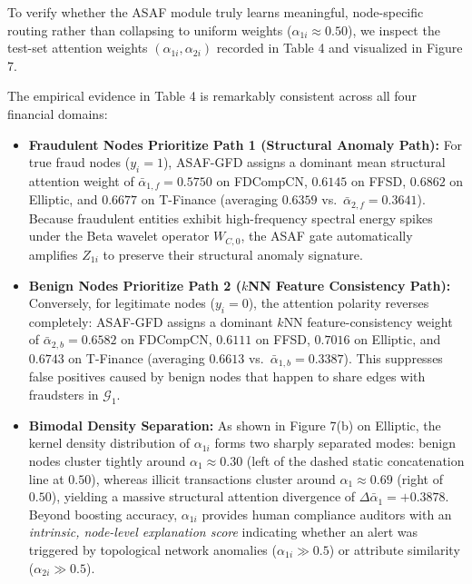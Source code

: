 \documentclass[10pt,a4paper,twocolumn]{article}
\begin{document}
To verify whether the ASAF module truly learns meaningful, node-specific routing rather than collapsing to uniform weights ($\alpha_{1i} \approx 0.50$), we inspect the test-set attention weights $(\alpha_{1i}, \alpha_{2i})$ recorded in Table 4 and visualized in Figure 7.

The empirical evidence in Table 4 is remarkably consistent across all four financial domains:

\begin{itemize}
  \item \textbf{Fraudulent Nodes Prioritize Path 1 (Structural Anomaly Path):} For true fraud nodes ($y_i = 1$), ASAF-GFD assigns a dominant mean structural attention weight of $\bar{\alpha}_{1,f} = \mathbf{0.5750}$ on FDCompCN, $\mathbf{0.6145}$ on FFSD, $\mathbf{0.6862}$ on Elliptic, and $\mathbf{0.6677}$ on T-Finance (averaging $0.6359$ vs.\ $\bar{\alpha}_{2,f} = 0.3641$). Because fraudulent entities exhibit high-frequency spectral energy spikes under the Beta wavelet operator $W_{C,0}$, the ASAF gate automatically amplifies $Z_{1i}$ to preserve their structural anomaly signature.
  \item \textbf{Benign Nodes Prioritize Path 2 ($k$NN Feature Consistency Path):} Conversely, for legitimate nodes ($y_i = 0$), the attention polarity reverses completely: ASAF-GFD assigns a dominant $k$NN feature-consistency weight of $\bar{\alpha}_{2,b} = \mathbf{0.6582}$ on FDCompCN, $\mathbf{0.6111}$ on FFSD, $\mathbf{0.7016}$ on Elliptic, and $\mathbf{0.6743}$ on T-Finance (averaging $0.6613$ vs.\ $\bar{\alpha}_{1,b} = 0.3387$). This suppresses false positives caused by benign nodes that happen to share edges with fraudsters in $\mathscr{G}_1$.
  \item \textbf{Bimodal Density Separation:} As shown in Figure 7(b) on Elliptic, the kernel density distribution of $\alpha_{1i}$ forms two sharply separated modes: benign nodes cluster tightly around $\alpha_1 \approx 0.30$ (left of the dashed static concatenation line at $0.50$), whereas illicit transactions cluster around $\alpha_1 \approx 0.69$ (right of $0.50$), yielding a massive structural attention divergence of $\Delta\bar{\alpha}_1 = +0.3878$. Beyond boosting accuracy, $\alpha_{1i}$ provides human compliance auditors with an \textit{intrinsic, node-level explanation score} indicating whether an alert was triggered by topological network anomalies ($\alpha_{1i} \gg 0.5$) or attribute similarity ($\alpha_{2i} \gg 0.5$).
\end{itemize}
\end{document}
